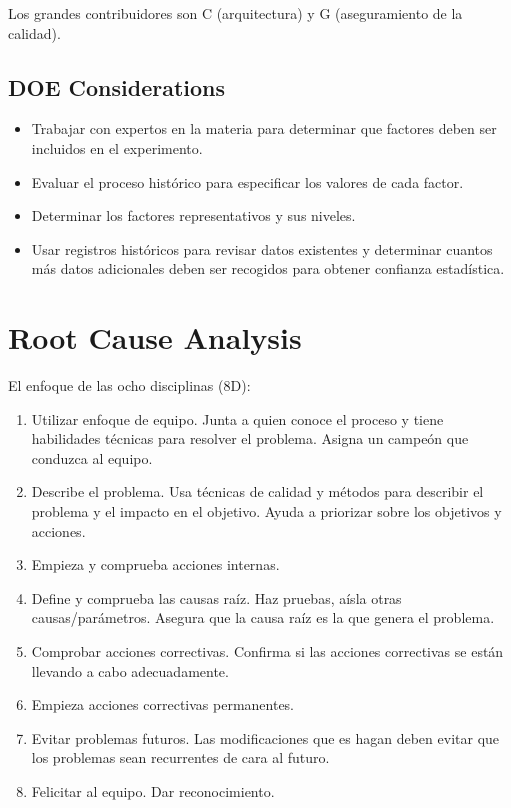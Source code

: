 \documentclass[]{article}
\begin{document}
Los grandes contribuidores son C (arquitectura) y G (aseguramiento de la calidad).

\subsection{DOE Considerations}

\begin{itemize}
	\item Trabajar con expertos en la materia para determinar que factores deben ser incluidos en el experimento.
	\item Evaluar el proceso histórico para especificar los valores de cada factor.
	\item Determinar los factores representativos y sus niveles.
	\item Usar registros históricos para revisar datos existentes y determinar cuantos más datos adicionales deben ser recogidos para obtener confianza estadística.
\end{itemize}

\section{Root Cause Analysis}

El enfoque de las ocho disciplinas (8D): \begin{enumerate}
	\item Utilizar enfoque de equipo. Junta a quien conoce el proceso y tiene habilidades técnicas para resolver el problema. Asigna un campeón que conduzca al equipo.
	\item Describe el problema. Usa técnicas de calidad y métodos para describir el problema y el impacto en el objetivo. Ayuda a priorizar sobre los objetivos y acciones.
	\item Empieza y comprueba acciones internas. 
	\item Define y comprueba las causas raíz. Haz pruebas, aísla otras causas/parámetros. Asegura que la causa raíz es la que genera el problema.
	\item Comprobar acciones correctivas. Confirma si las acciones correctivas se están llevando a cabo adecuadamente.
	\item Empieza acciones correctivas permanentes. 
	\item Evitar problemas futuros. Las modificaciones que es hagan deben evitar que los problemas sean recurrentes de cara al futuro.
	\item Felicitar al equipo. Dar reconocimiento.
\end{enumerate}
\end{document}
